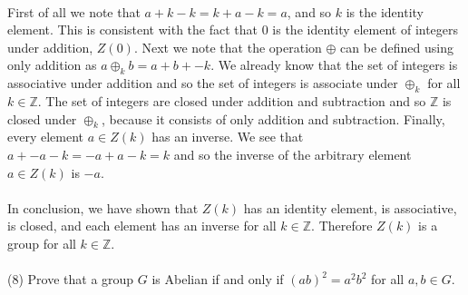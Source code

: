 \documentclass[11pt,a4paper]{article}
\begin{document}
~\\
First of all we note that $a+k-k = k + a -k = a$, and so $k$ is the identity element. This is consistent with the fact that $0$ is the identity element of integers under addition, $Z(0)$. Next we note that the operation $\oplus$ can be defined using only addition as $a \oplus_k b = a + b + -k$. We already know that the set of integers is associative under addition and so the set of integers is associate under $\oplus_k$ for all $k\in \mathbb{Z}$. The set of integers are closed under addition and subtraction and so $\mathbb{Z}$ is closed under $\oplus_k$, because it consists of only addition and subtraction. Finally, every element $a\in Z(k)$ has an inverse. We see that $a + -a -k = -a + a - k = k$ and so the inverse of the arbitrary element $a \in Z(k)$ is $-a$.\\
~\\
In conclusion, we have shown that $Z(k)$ has an identity element, is associative, is closed, and each element has an inverse for all $k\in \mathbb{Z}$. Therefore $Z(k)$ is a group for all $k\in \mathbb{Z}$.\\
~\\
(8) Prove that a group $G$ is Abelian if and only if $(ab)^2 = a^2 b^2$ for all $a, b \in G$.\\
~\\
\end{document}
